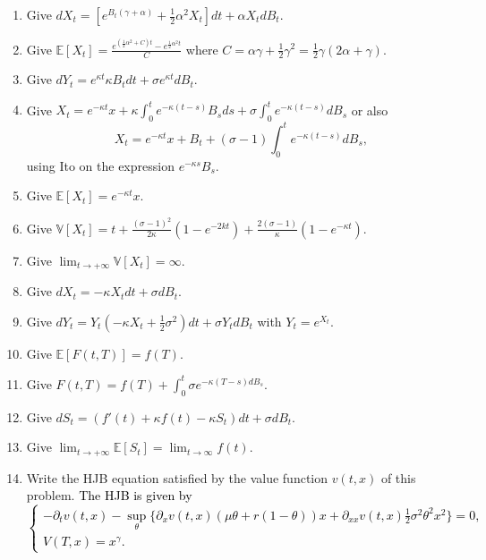 \documentclass[article,11pt]{amsart}
\numberwithin{equation}{section}
\newcommand{\1}{{\bf 1}}
\begin{document}
\begin{enumerate}[label=Q\arabic*., start=1]
    \item Give $dX_t = [e^{ B_t(\gamma + \alpha) } + \frac{1}{2} \alpha^2 X_t]dt + \alpha X_t dB_t$.
    \item Give $\mathbb{E}[X_t] = \frac{e^{(\frac{1}{2}\alpha^2 + C)t} - e^{\frac{1}{2}\alpha^2 t}}{C}$ where $C=\alpha \gamma + \frac{1}{2}\gamma^2 = \frac{1}{2}\gamma(2\alpha + \gamma)$.
    \item Give $dY_t = e^{\kappa t} \kappa B_t dt + \sigma e^{\kappa t} d B_t$.
    \item Give $X_t = e^{-\kappa t}x + \kappa \int_0^t e^{-\kappa(t-s)}B_s ds + \sigma \int_0^t e^{-\kappa(t-s)}dB_s$ or also
    \begin{equation*}
        X_t = e^{-\kappa t}x + B_t + (\sigma - 1 )\int_0^t e^{-\kappa(t-s)}dB_s,
    \end{equation*}
    using Ito on the expression $e^{-\kappa s}B_s$.
    \item Give $\mathbb{E}[X_t] = e^{-\kappa t}x$.
    \item Give $\mathbb{V}[X_t] = t + \frac{(\sigma -1)^2}{2 \kappa} (1-e^{-2kt}) + \frac{2(\sigma-1)}{\kappa}(1-e^{-\kappa t})$.
    \item Give $\lim_{t \to +\infty} \mathbb{V}[X_t] = \infty$.
    \item Give $dX_t = -\kappa X_t dt + \sigma dB_t$.
    \item Give $dY_t = Y_t (-\kappa X_t + \frac{1}{2}\sigma^2)dt + \sigma Y_t dB_t$ with $Y_t = e^{X_t}$.
    \item Give $\mathbb{E}[F(t, T)] = f(T)$.
    \item Give $F(t, T) = f(T) + \int_0^t \sigma e^{-\kappa(T-s)dB_s}$.
    \item Give $dS_t = (f'(t) + \kappa f(t) - \kappa S_t )dt + \sigma dB_t$.
    \item Give $\lim_{t \to +\infty} \mathbb{E}[S_t] = \lim_{t \rightarrow \infty} f(t) $.
    \item Write the HJB equation satisfied by the value function $v(t, x)$ of this problem.
        \textcolor{black}{The HJB is given by
        \begin{equation*}
        \begin{cases}
                    -\partial_t v(t,x) - \sup_\theta \bigg\{\partial_x v(t,x) (\mu \theta + r(1-\theta))x + \partial_{xx}v(t,x)\frac{1}{2}\sigma^2 \theta^2 x^2\bigg\} = 0,\\
                    V(T,x)=x^\gamma. 
        \end{cases}
        \end{equation*}
}
\end{enumerate}
\end{document}
